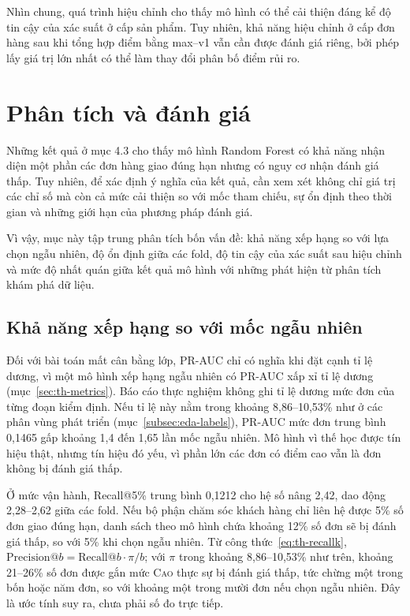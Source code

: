 \documentclass[12pt,a4paper]{report}
\begin{document}
Nhìn chung, quá trình hiệu chỉnh cho thấy mô hình có thể cải thiện đáng kể độ tin cậy của xác suất ở cấp sản phẩm. Tuy nhiên, khả năng hiệu chỉnh ở cấp đơn hàng sau khi tổng hợp điểm bằng max--v1 vẫn cần được đánh giá riêng, bởi phép lấy giá trị lớn nhất có thể làm thay đổi phân bố điểm rủi ro.

\section{Phân tích và đánh giá}\label{sec:results-analysis}

Những kết quả ở mục 4.3 cho thấy mô hình Random Forest có khả năng nhận diện một phần các đơn hàng giao đúng hạn nhưng có nguy cơ nhận đánh giá thấp. Tuy nhiên, để xác định ý nghĩa của kết quả, cần xem xét không chỉ giá trị các chỉ số mà còn cả mức cải thiện so với mốc tham chiếu, sự ổn định theo thời gian và những giới hạn của phương pháp đánh giá.

Vì vậy, mục này tập trung phân tích bốn vấn đề: khả năng xếp hạng so với lựa chọn ngẫu nhiên, độ ổn định giữa các fold, độ tin cậy của xác suất sau hiệu chỉnh và mức độ nhất quán giữa kết quả mô hình với những phát hiện từ phân tích khám phá dữ liệu.

\subsection{Khả năng xếp hạng so với mốc ngẫu nhiên}\label{sec:analysis-ranking}

Đối với bài toán mất cân bằng lớp, PR-AUC chỉ có nghĩa khi đặt cạnh tỉ lệ dương, vì một mô hình xếp hạng ngẫu nhiên có PR-AUC xấp xỉ tỉ lệ dương (mục~\ref{sec:th-metrics}). Báo cáo thực nghiệm không ghi tỉ lệ dương mức đơn của từng đoạn kiểm định. Nếu tỉ lệ này nằm trong khoảng 8,86--10,53\% như ở các phân vùng phát triển (mục~\ref{subsec:eda-labels}), PR-AUC mức đơn trung bình 0,1465 gấp khoảng 1,4 đến 1,65 lần mốc ngẫu nhiên. Mô hình vì thế học được tín hiệu thật, nhưng tín hiệu đó yếu, vì phần lớn các đơn có điểm cao vẫn là đơn không bị đánh giá thấp.

Ở mức vận hành, Recall@5\% trung bình 0,1212 cho hệ số nâng 2,42, dao động 2,28--2,62 giữa các fold. Nếu bộ phận chăm sóc khách hàng chỉ liên hệ được 5\% số đơn giao đúng hạn, danh sách theo mô hình chứa khoảng 12\% số đơn sẽ bị đánh giá thấp, so với 5\% khi chọn ngẫu nhiên. Từ công thức~\eqref{eq:th-recallk}, $\mathrm{Precision@}b = \mathrm{Recall@}b \cdot \pi / b$; với $\pi$ trong khoảng 8,86--10,53\% như trên, khoảng 21--26\% số đơn được gắn mức \textsc{Cao} thực sự bị đánh giá thấp, tức chừng một trong bốn hoặc năm đơn, so với khoảng một trong mười đơn nếu chọn ngẫu nhiên. Đây là ước tính suy ra, chưa phải số đo trực tiếp.
\end{document}
